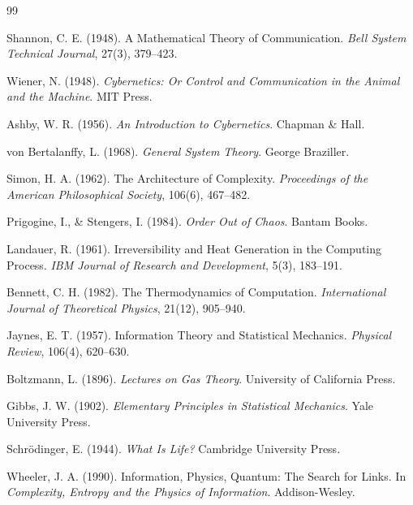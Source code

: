 \documentclass[11pt,oneside]{book}
\theoremstyle{plain}
\theoremstyle{definition}
\theoremstyle{remark}
\begin{document}
\newpage

\begin{thebibliography}{99}

Shannon, C. E. (1948).
\newblock A Mathematical Theory of Communication.
\newblock
\emph{Bell System Technical Journal}, 27(3), 379--423.

Wiener, N. (1948).
\newblock
\emph{Cybernetics: Or Control and Communication in the Animal and the Machine}.
\newblock MIT Press.

Ashby, W. R. (1956).
\newblock
\emph{An Introduction to Cybernetics}.
\newblock Chapman
\& Hall.

von Bertalanffy, L. (1968).
\newblock
\emph{General System Theory}.
\newblock George Braziller.

Simon, H. A. (1962).
\newblock The Architecture of Complexity.
\newblock
\emph{Proceedings of the American Philosophical Society}, 106(6), 467--482.

Prigogine, I.,
\& Stengers, I. (1984).
\newblock
\emph{Order Out of Chaos}.
\newblock Bantam Books.

Landauer, R. (1961).
\newblock Irreversibility and Heat Generation in the Computing Process.
\newblock
\emph{IBM Journal of Research and Development}, 5(3), 183--191.

Bennett, C. H. (1982).
\newblock The Thermodynamics of Computation.
\newblock
\emph{International Journal of Theoretical Physics}, 21(12), 905--940.

Jaynes, E. T. (1957).
\newblock Information Theory and Statistical Mechanics.
\newblock
\emph{Physical Review}, 106(4), 620--630.

Boltzmann, L. (1896).
\newblock
\emph{Lectures on Gas Theory}.
\newblock University of California Press.

Gibbs, J. W. (1902).
\newblock
\emph{Elementary Principles in Statistical Mechanics}.
\newblock Yale University Press.

Schr\"odinger, E. (1944).
\newblock
\emph{What Is Life?}
\newblock Cambridge University Press.

Wheeler, J. A. (1990).
\newblock Information, Physics, Quantum: The Search for Links.
\newblock In
\emph{Complexity, Entropy and the Physics of Information}.
\newblock Addison-Wesley.


\end{thebibliography}
\end{document}
